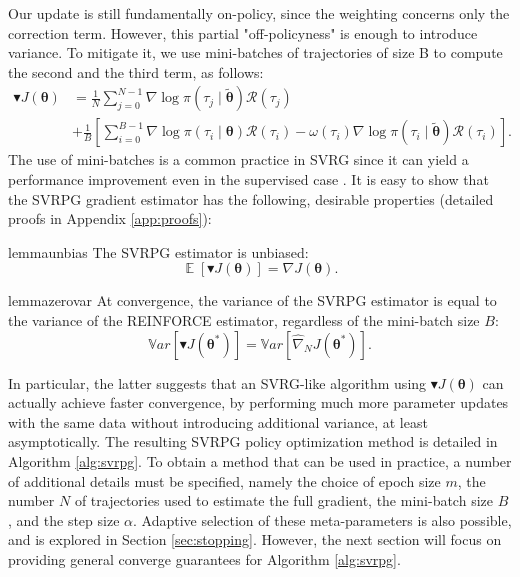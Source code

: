 \documentclass{article}
\theoremstyle{remark}
\theoremstyle{definition}
\newcommand{\vtheta}{\boldsymbol{\theta}}
\newcommand{\Reward}{\mathcal{R}}
\newcommand{\gradJ}[1]{\nabla J(#1)}
\newcommand{\gradApp}[2]{\hat{\nabla}_{#2}J(#1)}
\newcommand{\gradBlack}[1]{\blacktriangledown J(#1)}
\begin{document}
Our update is still fundamentally on-policy, since the weighting concerns only the correction term. However, this partial "off-policyness" is enough to introduce variance. To mitigate it, we use mini-batches of trajectories of size B to compute the second and the third term, as follows:
\begin{align*}
\blacktriangledown J(\vtheta) &= \frac{1}{N}\sum_{j=0}^{N-1}\nabla\log\pi(\tau_j \mid \tilde{\vtheta})\Reward(\tau_j) \\
&+ \frac{1}{B}\left[\sum_{i=0}^{B-1}
\nabla\log\pi(\tau_i \mid \vtheta)\Reward(\tau_i) 
- \omega(\tau_i)\nabla\log\pi(\tau_i \mid \tilde{\vtheta})\Reward(\tau_i)\right].
\end{align*}
The use of mini-batches is a common practice in SVRG since it can yield a performance improvement even in the supervised case \cite{konevcny2016mini} \cite{harikandeh2015stopwasting}. It is easy to show that the SVRPG gradient estimator has the following, desirable properties (detailed proofs in Appendix \ref{app:proofs}):
\begin{restatable}{lemma}{unbias}\label{lemma:unbias}
The SVRPG estimator is unbiased:
\[
\mathop{\mathbb{E}}
\left[\blacktriangledown J(\vtheta)\right] = \gradJ{\vtheta}.
\]
\end{restatable}
\begin{restatable}{lemma}{zerovar}\label{lemma:zerovar}
At convergence, the variance of the SVRPG estimator is equal to the variance of the REINFORCE estimator, regardless of the mini-batch size $B$:
\[
	\mathbb{V}ar\left[\gradBlack{\vtheta^*}\right] = 
	\mathbb{V}ar\left[\gradApp{\vtheta^*}{N}\right].
\]
\end{restatable}
In particular, the latter suggests that an SVRG-like algorithm using $\gradBlack{\vtheta}$ can actually achieve faster convergence, by performing much more parameter updates with the same data without introducing additional variance, at least asymptotically.
The resulting SVRPG policy optimization method is detailed in Algorithm \ref{alg:svrpg}.
To obtain a method that can be used in practice, a number of additional details must be specified, namely the choice of epoch size $m$, the number $N$ of trajectories used to estimate the full gradient, the mini-batch size $B$, and the step size $\alpha$. Adaptive selection of these meta-parameters is also possible, and is explored in Section \ref{sec:stopping}. However, the next section will focus on providing general converge guarantees for Algorithm \ref{alg:svrpg}.
\end{document}

